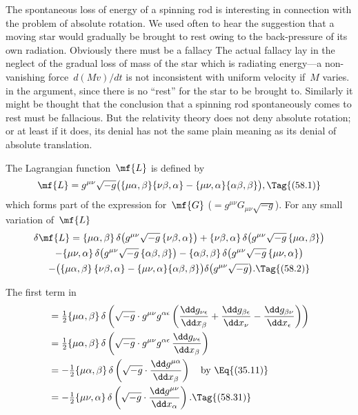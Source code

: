\documentclass[12pt]{book}
\begin{document}
The spontaneous loss of energy of a spinning rod is interesting in connection with the problem of absolute rotation.
We used often to hear the suggestion that a moving star would gradually be brought to rest owing to the
back\hyp{}pressure of its own radiation.
Obviously there must be a fallacy\footnotemark\footnotetext
     {The actual fallacy lay in the neglect of the gradual loss of mass of the star which is radiating energy---a
      non\hyp{}vanishing force~$d(Mv)/dt$ is not inconsistent with uniform velocity if~$M$ varies.}
in the argument, since there is no ``rest'' for the star to be brought to.
Similarly it might be thought that the conclusion that a spinning rod spontaneously comes to rest must be fallacious.
But the relativity theory does not deny absolute rotation;
or at least if it does, its denial has not the same plain meaning as its denial of absolute translation.


The Lagrangian function~$\mf{L}$ is defined by
%
\[
\mf{L} = g^{\mu\nu} \sqrt{-g}
\bigl(\{\mu\alpha, \beta\}\{\nu\beta, \alpha\}
    - \{\mu\nu, \alpha\} \{\alpha\beta, \beta\}\bigr),
\Tag{(58.1)}
\]
which forms part of the expression for~$\mf{G}$ ($= g^{\mu\nu} G_{\mu\nu} \sqrt{-g}$). For any small
variation of~$\mf{L}$
\begin{multline*}
  \delta\mf{L}
  = \{\mu\alpha, \beta\}\, \delta\bigl(g^{\mu\nu} \sqrt{-g}\, \{\nu\beta, \alpha\}\bigr)
  + \{\nu\beta, \alpha\}\, \delta\bigl(g^{\mu\nu} \sqrt{-g}\, \{\mu\alpha, \beta\}\bigr) \\
  - \{\mu\nu, \alpha\}\, \delta\bigl(g^{\mu\nu} \sqrt{-g}\, \{\alpha\beta, \beta\}\bigr)
  - \{\alpha\beta, \beta\}\, \delta\bigl(g^{\mu\nu} \sqrt{-g}\, \{\mu\nu, \alpha\}\bigr) \\
  - \bigl(\{\mu\alpha, \beta\}\, \{\nu\beta, \alpha\} - \{\mu\nu, \alpha\}\{\alpha\beta, \beta\}\bigr)
  \delta\bigl(g^{\mu\nu} \sqrt{-g}\bigr).
  \Tag{(58.2)}
\end{multline*}

The first term in~
\begin{align*}
  &= \tfrac{1}{2} \{\mu\alpha, \beta\}\, \delta\left(\sqrt{-g} \cdot g^{\mu\nu} g^{\alpha\epsilon}
  \left(\frac{\dd g_{\nu\epsilon}}{\dd x_{\beta}}
  + \frac{\dd g_{\beta\epsilon}}{\dd x_{\nu}}
  - \frac{\dd g_{\beta\nu}}{\dd x_{\epsilon}}\right)\right) \\
  &= \tfrac{1}{2} \{\mu\alpha, \beta\}\, \delta\left(\sqrt{-g} \cdot g^{\mu\nu} g^{\alpha\epsilon}\, \frac{\dd g_{\nu\epsilon}}{\dd x_{\beta}}\right) \\
  &= -\tfrac{1}{2} \{\mu\alpha, \beta\}\, \delta\left(\sqrt{-g} \cdot \frac{\dd g^{\mu\alpha}}{\dd x_{\beta}}\right)
  \quad\text{by \Eq{(35.11)}} \\
  &= -\tfrac{1}{2} \{\mu\nu, \alpha\}\, \delta\left(\sqrt{-g} \cdot \frac{\dd g^{\mu\nu}}{\dd x_{\alpha}}\right).
  \Tag{(58.31)}
\end{align*}
\end{document}
